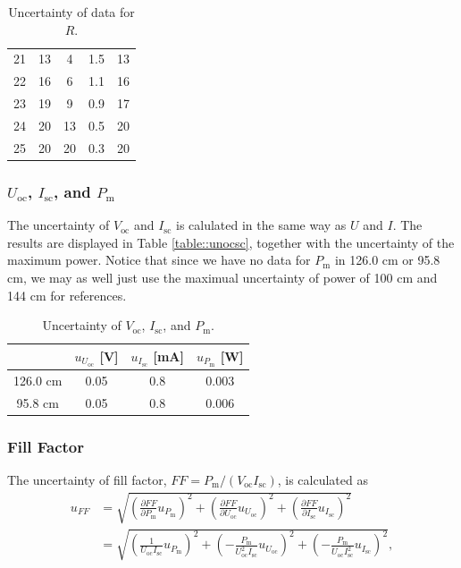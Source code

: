 \documentclass[a4paper]{article}
\begin{document}
\begin{table}[H]
\begin{tabular}{c|cccc}
		21 & 13                                   & 4        & 1.5    & 13     \\
		22 & 16                                   & 6        & 1.1    & 16     \\
		23 & 19                                   & 9        & 0.9    & 17     \\
		24 & 20                                   & 13       & 0.5    & 20     \\
		25 & 20                                   & 20       & 0.3    & 20     \\
		\hline
	\end{tabular}
	\caption{Uncertainty of data for $R$.}
	\label{table::unR}
\end{table}

\subsubsection{$U_\text{oc}$, $I_\text{sc}$, and $P_\text{m}$}

The uncertainty of $V_\text{oc}$ and $I_\text{sc}$ is calulated in the same way as $U$ and $I$.
The results are displayed in Table \ref{table::unocsc}, together with the uncertainty of the maximum power.
Notice that since we have no data for $P_\text{m}$ in 126.0 cm or 95.8 cm, we may as well just use the maximual uncertainty of power of 100 cm and 144 cm for references.

\begin{table}[H]
	\centering
	\begin{tabular}{cccc}
		\hline
		         & $u_{U_\text{oc}}$ [V] & $u_{I_\text{sc}}$ [mA] & $u_{P_\text{m}}$ [W] \\
		\hline
		126.0 cm & 0.05                  & 0.8                    & 0.003                \\
		95.8 cm  & 0.05                  & 0.8                    & 0.006                \\
		\hline
	\end{tabular}
	\caption{Uncertainty of $V_\text{oc}$, $I_\text{sc}$, and $P_\text{m}$.}
	\label{table:unocsc}
\end{table}

\subsubsection{Fill Factor}

The uncertainty of fill factor, $FF = P_\text{m}/(V_\text{oc}I_\text{sc})$, is calculated as
\begin{align*}
	u_{FF} & = \sqrt{(\frac{\partial FF}{\partial P_\text{m}}u_{P_\text{m}})^2 + (\frac{\partial FF}{\partial U_\text{oc}}u_{U_\text{oc}})^2 + (\frac{\partial FF}{\partial I_\text{sc}}u_{I_\text{sc}})^2}   \\
	       & = \sqrt{(\frac{1}{U_\text{oc}I_\text{sc}}u_{P_\text{m}})^2 + (-\frac{P_\text{m}}{U_\text{oc}^2I_\text{sc}}u_{U_\text{oc}})^2 + (-\frac{P_\text{m}}{U_\text{oc}I_\text{sc}^2}u_{I_\text{sc}})^2},
\end{align*}
\end{document}
